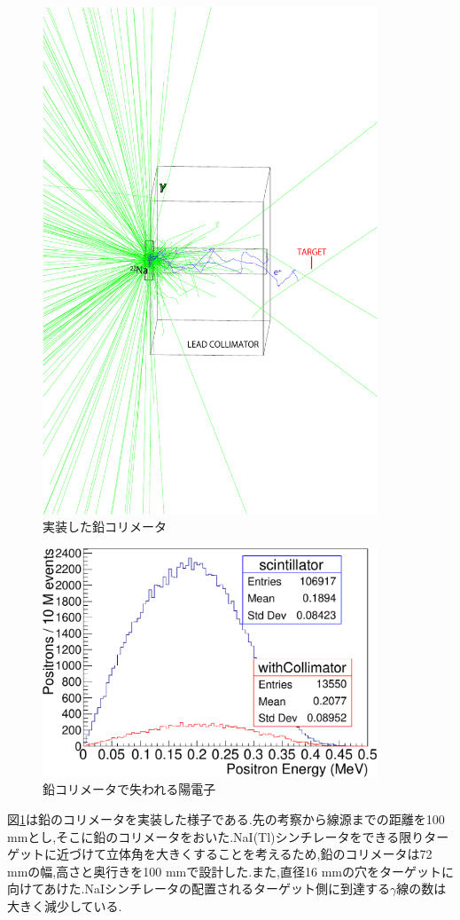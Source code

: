 \begin{figure}[htbp]
	\centering
		\includegraphics[width=10cm]{img/test1b_geometry.pdf}
	\caption{実装した鉛コリメータ}
	\label{test1b_geometry}
\end{figure}

\begin{figure}[htbp]
	\centering
		\includegraphics[width=10cm]{fig/collimator_loss.pdf}
	\caption{鉛コリメータで失われる陽電子}
	\label{collimator_loss}
\end{figure}

図\ref{test1b_geometry}は鉛のコリメータを実装した様子である.先の考察から線源までの距離を100 mmとし,そこに鉛のコリメータをおいた.NaI(Tl)シンチレータをできる限りターゲットに近づけて立体角を大きくすることを考えるため,鉛のコリメータは72 mmの幅,高さと奥行きを100 mmで設計した.また,直径16 mmの穴をターゲットに向けてあけた.NaIシンチレータの配置されるターゲット側に到達する$\gamma$線の数は大きく減少している.

